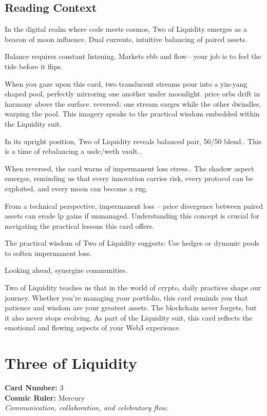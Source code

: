 \documentclass[11pt,oneside]{book}
\begin{document}
\begin{minipage}[t]{0.55\textwidth}
  \subsection*{Reading Context}
  In the digital realm where code meets cosmos, Two of Liquidity emerges as a beacon of moon influence. Dual currents, intuitive balancing of paired assets.

  Balance requires constant listening. Markets ebb and flow—your job is to feel the tide before it flips.

  When you gaze upon this card, two translucent streams pour into a yin-yang shaped pool, perfectly mirroring one another under moonlight. price orbs drift in harmony above the surface. reversed: one stream surges while the other dwindles, warping the pool. This imagery speaks to the practical wisdom embedded within the Liquidity suit.

  In its upright position, Two of Liquidity reveals balanced pair, 50/50 blend.. This is a time of rebalancing a usdc/weth vault..

  When reversed, the card warns of impermanent loss stress.. The shadow aspect emerges, reminding us that every innovation carries risk, every protocol can be exploited, and every moon can become a rug.

  From a technical perspective, impermanent loss – price divergence between paired assets can erode lp gains if unmanaged. Understanding this concept is crucial for navigating the practical lessons this card offers.

  The practical wisdom of Two of Liquidity suggests: Use hedges or dynamic pools to soften impermanent loss.

  Looking ahead, synergize communities.

  Two of Liquidity teaches us that in the world of crypto, daily practices shape our journey. Whether you're managing your portfolio, this card reminds you that patience and wisdom are your greatest assets. The blockchain never forgets, but it also never stops evolving. As part of the Liquidity suit, this card reflects the emotional and flowing aspects of your Web3 experience.

\end{minipage}

\newpage
\section*{Three of Liquidity}

\begin{minipage}[t]{0.55\textwidth}
  \vspace{0pt}
  \textbf{Card Number:} 3\\  \textbf{Cosmic Ruler:} Mercury\\  \textit{Communication, collaboration, and celebratory flow.}
\end{minipage}
\end{document}
